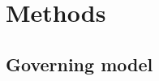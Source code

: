 \providecommand{\PENDINGMACRO}[1]{\textbf{[PENDING: #1]}}

\section{Methods}
\label{sec:methods}

\subsection*{Governing model}

